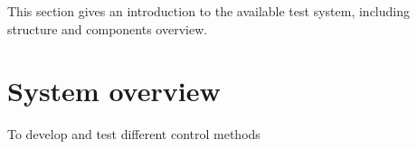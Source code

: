 This section gives an introduction to the available test system, including structure and components overview.  

\section{System overview}
\label{system_overview}
To develop and test different control methods 